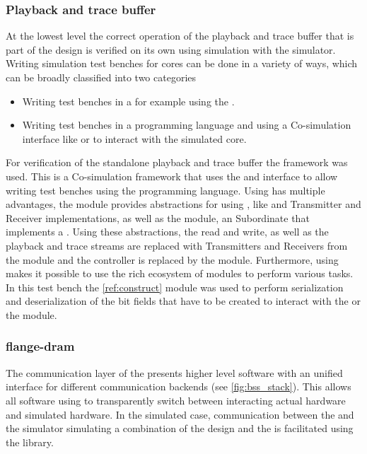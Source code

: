 \subsubsection{Playback and trace buffer}
At the lowest level the correct operation of the playback and trace buffer that is part of the \FPGA{} design is verified on its own using simulation with the \xcelium{} simulator.
Writing simulation test benches for \FPGA{} cores can be done in a variety of ways, which can be broadly classified into two categories
\begin{itemize}
    \item Writing test benches in a \hdl{} for example using the \uvmframework{}\autocite{ref:uvm}.
    \item Writing test benches in a programming language and using a Co-simulation interface like \VPI{}\autocite{ref:vpi} or \DPI{}\autocite{ref:dpi} to interact with the simulated \FPGA{} core.
\end{itemize}
For verification of the standalone playback and trace buffer the \cocotb{} framework was used. This is a Co-simulation framework that uses the \VPI{} and \VHPI{}\autocite{ref:vhpi} interface to allow writing test benches using the \python{} programming language. Using \cocotb{} has multiple advantages, the \cocotbaxi{} module provides abstractions for using \AXI{}, like \AXI{} and \AXIStream{} Transmitter and Receiver implementations, as well as the \AXIRAM{} module, an \AXI{} Subordinate that implements a \RAM{}. Using these abstractions, the \HostARQ{} read and write, as well as the playback and trace streams are replaced with \AXIStream{} Transmitters and Receivers from the \cocotbaxi{} module and the \AXI{} \DRAM{} controller is replaced by the \AXIRAM{} module.
Furthermore, using \python{} makes it possible to use the rich ecosystem of \python{} modules to perform various tasks. In this test bench the \construct{}\autoref{ref:construct} module was used to perform serialization and deserialization of the bit fields that have to be created to interact with the \FAXI{} or the \AXIDMA{} module.

\subsubsection{flange-dram}
The communication layer of the \bssTwoOS{} presents higher level software with an unified interface for different communication backends (see \autoref{fig:bss_stack}). This allows all software using \hxcomm{} to transparently switch between interacting actual hardware and simulated hardware. In the simulated case, communication between the \hxcomm{} and the simulator simulating a combination of the \FPGA{} design and the \ASIC{} is facilitated using the \flange{} library.

